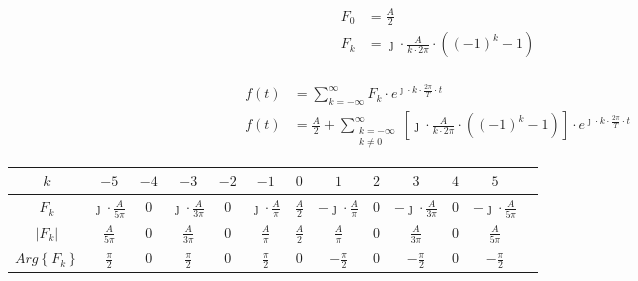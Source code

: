 \begin{task}
\begin{align*}
F_0&=\frac{A}{2}\\
F_k&=\jmath \cdot \frac{A}{k\cdot 2 \pi}\cdot \left( (-1)^{k} -1 \right)\\
\end{align*}


\begin{equation}
\begin{aligned}
f(t) &= \sum_{k=-\infty}^{\infty} F_k \cdot e^{\jmath \cdot k \cdot \frac{2\pi}{T} \cdot t}\\
f(t) &= \frac{A}{2}+\sum_{\begin{smallmatrix}k=-\infty \\ k \neq 0 \end{smallmatrix}}^{\infty} \left[\jmath \cdot \frac{A}{k\cdot 2 \pi}\cdot \left( (-1)^{k} -1 \right)\right] \cdot e^{\jmath \cdot k \cdot \frac{2\pi}{T} \cdot t}
\end{aligned}
\end{equation}


\begin{table}[H]
\centering  
\begin{tabular}{|c|c|c|c|c|c|c|c|c|c|c|c|c|}
  \hline 
  $k$ & $-5$ & $-4$ & $-3$ & $-2$ & $-1$ & $0$ & $1$ & $2$ & $3$ & $4$ & $5$\\ 
  \hline 
  $F_k$ & $\jmath \cdot \frac{A}{5 \pi}$ & $0$ & $\jmath \cdot \frac{A}{3 \pi}$ & $0$ & $\jmath \cdot \frac{A}{\pi}$ & $\frac{A}{2}$ & $-\jmath \cdot \frac{A}{\pi}$ & $0$ & $-\jmath \cdot \frac{A}{3 \pi}$ & $0$ & $-\jmath \cdot \frac{A}{5 \pi}$\\ 
  \hline 
  $\left| F_k \right|$ & $\frac{A}{5 \pi}$ & $0$ & $\frac{A}{3 \pi}$ & $0$ & $\frac{A}{\pi}$ & $\frac{A}{2}$ & $\frac{A}{\pi}$ & $0$ & $\frac{A}{3 \pi}$ & $0$ & $\frac{A}{5 \pi}$\\
  \hline
  $Arg\left\{ F_k \right\}$ & $\frac{\pi}{2}$ & $0$ & $\frac{\pi}{2}$ & $0$ & $\frac{\pi}{2}$ & $0$ & $-\frac{\pi}{2}$ & $0$ & $-\frac{\pi}{2}$ & $0$ & $-\frac{\pi}{2}$\\
  \hline
\end{tabular} 
\end{table}


\end{task}
